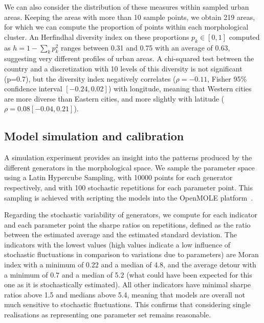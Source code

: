 \documentclass[letterpaper]{article}
\begin{document}
We can also consider the distribution of these measures within sampled urban areas. Keeping the areas with more than 10 sample points, we obtain 219 areas, for which we can compute the proportion of points within each morphological cluster. An Herfindhal diversity index on these proportions $p_k \in \left[0,1\right]$ computed as $h = 1 - \sum_k p_k^2$ ranges between 0.31 and 0.75 with an average of 0.63, suggesting very different profiles of urban areas. A chi-squared test between the country and a discretization with 10 levels of this diversity is not significant (p=0.7), but the diversity index negatively correlates ($\rho = -0.11$, Fisher 95\% confidence interval $\left[-0.24,0.02\right]$) with longitude, meaning that Western cities are more diverse than Eastern cities, and more slightly with latitude ($\rho = 0.08 \left[-0.04,0.21\right]$).




\subsection{Model simulation and calibration}



A simulation experiment provides an insight into the patterns produced by the different generators in the morphological space. We sample the parameter space using a Latin Hypercube Sampling, with 10000 points for each generator respectively, and with 100 stochastic repetitions for each parameter point. This sampling is achieved with scripting the models into the OpenMOLE platform~\citep{reuillon2013openmole}.

Regarding the stochastic variability of generators, we compute for each indicator and each parameter point the sharpe ratios on repetitions, defined as the ratio between the estimated average and the estimated standard deviation. The indicators with the lowest values (high values indicate a low influence of stochastic fluctuations in comparison to variations due to parameters) are Moran index with a minimum of 0.22 and a median of 4.8, and the average detour with a minimum of 0.7 and a median of 5.2 (what could have been expected for this one as it is stochastically estimated). All other indicators have minimal sharpe ratios above 1.5 and medians above 5.4, meaning that models are overall not much sensitive to stochastic fluctuations. This confirms that considering single realisations as representing one parameter set remains reasonable.
\end{document}
